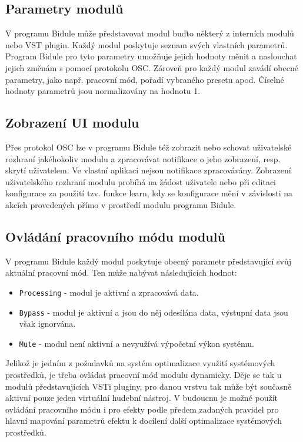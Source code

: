 \documentclass[thesis=M,czech]{FITthesis}[2019/03/06]
\begin{document}
		\subsection{Parametry modulů}
		V programu Bidule může představovat modul buďto některý z interních modulů nebo VST plugin. Každý modul poskytuje seznam svých vlastních parametrů.
		Program Bidule pro tyto parametry umožňuje jejich hodnoty měnit a naslouchat jejich změnám s pomocí protokolu OSC.
		Zároveň pro každý modul zavádí obecné parametry, jako např. pracovní mód, pořadí vybraného presetu apod.
		Číselné hodnoty parametrů jsou normalizovány na hodnotu 1.

		\subsection{Zobrazení UI modulu}
		Přes protokol OSC lze v programu Bidule též zobrazit nebo schovat uživatelské rozhraní jakéhokoliv modulu a zpracovávat notifikace
		o jeho zobrazení, resp. skrytí uživatelem. Ve vlastní aplikaci nejsou notifikace zpracovávány. Zobrazení uživatelského rozhraní modulu
		probíhá na žádost uživatele nebo při editaci konfigurace za použití tzv. funkce learn, kdy se konfigurace mění v závislosti
		na akcích provedených přímo v prostředí modulu programu Bidule.

		\subsection{Ovládání pracovního módu modulů}
		V programu Bidule každý modul poskytuje obecný parametr představující svůj aktuální pracovní mód. Ten může nabývat následujících hodnot:
		\begin{itemize}
			\item \texttt{Processing} - modul je aktivní a zpracovává data.
			\item \texttt{Bypass} - modul je aktivní a jsou do něj odesílána data, výstupní data jsou však ignorvána.
			\item \texttt{Mute} - modul není aktivní a nevyužívá výpočetní výkon systému.
		\end{itemize}
		Jelikož je jedním z požadavků na systém optimalizace využití systémových prostředků, je třeba ovládat
		pracovní mód modulu dynamicky. Děje se tak u modulů představujících VSTi pluginy, pro danou vrstvu 
		tak může být současně aktivní pouze jeden virtuální hudební nástroj. V budoucnu je možné použít ovládání pracovního módu
		i pro efekty podle předem zadaných pravidel pro hlavní mapování parametrů efektu k docílení další optimalizace
		systémových prostředků.
\end{document}
